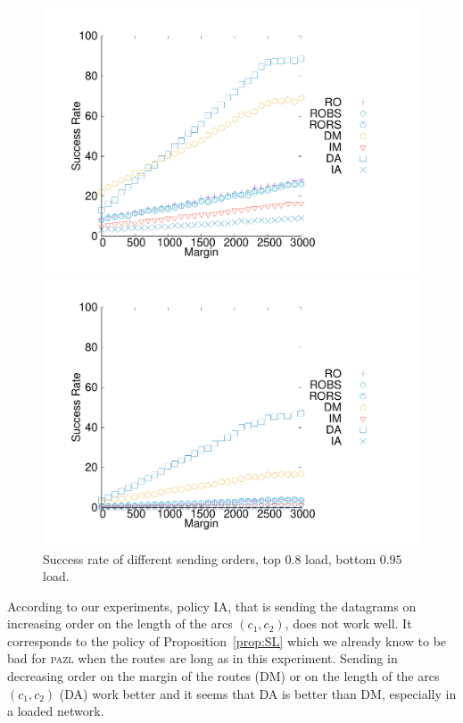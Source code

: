 \documentclass[a4paper,10pt]{journal}
\newcommand\pazl{\textsc{pazl}\xspace}
\begin{document}
 
\begin{figure}[h] 
\begin{center} 
  \includegraphics[width=0.7\linewidth]{departs_gp_250001.pdf}

  \includegraphics[width=0.7\linewidth]{departs_gp_210001.pdf}

      \caption{Success rate of different sending orders, top $0.8$ load, bottom $0.95$ load.}
           \label{fig:success1random}
           \end{center}

     \end{figure}

          
     According to our experiments, policy IA, that is sending the datagrams on increasing order on the length of the arcs $(c_1,c_2)$, does not work well. It corresponds to the policy of Proposition~\ref{prop:SL} which we already know to be bad for \pazl when the routes are long as in this experiment. Sending in decreasing order on the margin of the routes (DM) or on the length of the arcs $(c_1,c_2)$ (DA) work better and it seems that DA is better than DM, especially in a loaded network. 
     
\end{document}
